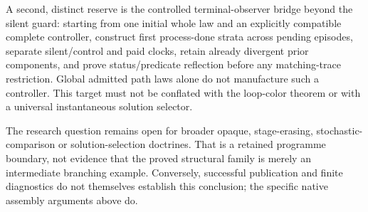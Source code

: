 \documentclass[11pt]{article}
\begin{document}
A second, distinct reserve is the controlled terminal-observer bridge beyond the silent guard: starting from one initial whole law and an explicitly compatible complete controller, construct first process-done strata across pending episodes, separate silent/control and paid clocks, retain already divergent prior components, and prove status/predicate reflection before any matching-trace restriction. Global admitted path laws alone do not manufacture such a controller. This target must not be conflated with the loop-color theorem or with a universal instantaneous solution selector.

The research question remains open for broader opaque, stage-erasing, stochastic-comparison or solution-selection doctrines. That is a retained programme boundary, not evidence that the proved structural family is merely an intermediate branching example. Conversely, successful publication and finite diagnostics do not themselves establish this conclusion; the specific native assembly arguments above do.
\end{document}
